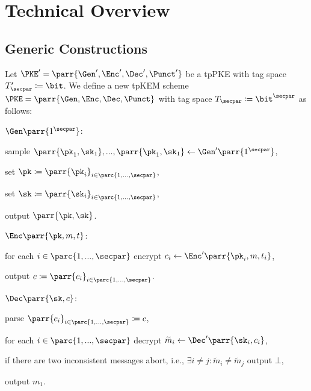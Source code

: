 \section{Technical Overview}
\label{sec:overview}


\subsection{Generic Constructions}

\begin{construction}\label{con:sel-to-ad}
    Let \(\PKE' = \parr{\Gen',\Enc',\Dec',\Punct'}\) be a tpPKE with tag space \(T'_\secpar \coloneqq \bit\).
    We define a new tpKEM scheme \(\PKE = \parr{\Gen,\Enc,\Dec,\Punct}\) with tag space \(T_\secpar \coloneqq \bit^\secpar\) as follows:
    \begin{sitemize}
        \item \(\Gen\parr{1^\secpar}\):
        \begin{sitemize}
            \item sample \(\parr{\pk_1,\sk_1}, ..., \parr{\pk_1,\sk_1} \gets \Gen'\parr{1^\secpar}\),
            \item set \(\pk \coloneqq \parr{\pk_i}_{i \in \parc{1,...,\secpar}}\),
            \item set \(\sk \coloneqq \parr{\sk_i}_{i \in \parc{1,...,\secpar}}\),
            \item output \(\parr{\pk,\sk}\).
        \end{sitemize}

        \item \(\Enc\parr{\pk,m,t}\):
        \begin{sitemize}
            \item for each \(i \in \parc{1,...,\secpar}\) encrypt \(c_i \gets \Enc'\parr{\pk_i,m,t_i}\),
            \item output \(c \coloneqq \parr{c_i}_{i \in \parc{1,...,\secpar}}\).
        \end{sitemize}

        \item \(\Dec\parr{\sk,c}\):
        \begin{sitemize}
            \item parse \(\parr{c_i}_{i \in \parc{1,...,\secpar}} \coloneqq c\),
            \item for each \(i \in \parc{1,...,\secpar}\) decrypt \(\widetilde{m}_i \gets \Dec'\parr{\sk_i,c_i}\),
            \item if there are two inconsistent messages abort, i.e., \(\exists i \neq j : \widetilde{m}_i \neq \widetilde{m}_j\) output \(\bot\),
            \item output \(m_1\).
        \end{sitemize}


\end{sitemize}
\end{construction}
